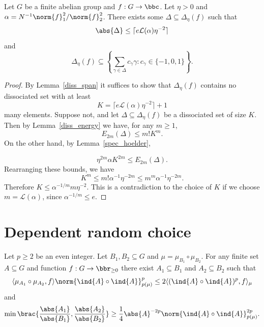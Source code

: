 \begin{theorem}
\label{chang}
\leanok
Let $G$ be a finite abelian group and $f:G\to \bbc$. Let $\eta >0$ and $\alpha=N^{-1}\norm{f}_1^2/\norm{f}_2^2$. There exists some $\Delta\subseteq \Delta_\eta(f)$ such that
\[\abs{\Delta}\le \lceil e\mathcal{L}(\alpha)\eta^{-2}\rceil \]
and
\[\Delta_\eta(f)\subseteq \left\{ \sum_{\gamma\in\Delta}c_\gamma \gamma : c_\gamma\in \{-1,0,1\} \right\}.\]
\end{theorem}

\begin{proof}
\leanok
By Lemma~\ref{diss_span} it suffices to show that $\Delta_\eta(f)$ contains no dissociated set with at least
\[K= \lceil e\mathcal{L}(\alpha)\eta^{-2}\rceil+1\]
many elements. Suppose not, and let $\Delta\subseteq \Delta_\eta(f)$ be a dissociated set of size $K$. Then by Lemma~\ref{diss_energy} we have, for any $m\geq 1$,
\[E_{2m}(\Delta)\le m!K^m.\]
On the other hand, by Lemma~\ref{spec_hoelder},

\[\eta^{2m}\alpha K^{2m}\le E_{2m}(\Delta).\]
Rearranging these bounds, we have
\[K^m \le m! \alpha^{-1}\eta^{-2m}\le m^m\alpha^{-1}\eta^{-2m}.\]
Therefore $K\le \alpha^{-1/m}m\eta^{-2}$. This is a contradiction to the choice of $K$ if we choose $m=\mathcal{L}(\alpha)$, since $\alpha^{-1/m}\le e$.
\end{proof}


\chapter{Dependent random choice}


\begin{lemma}
\label{drc}
\leanok
Let $p\geq 2$ be an even integer. Let $B_1,B_2\subseteq G$ and $\mu=\mu_{B_1}\circ\mu_{B_2}$. For any finite set $A\subseteq G$ and function $f:G\to\bbr_{\geq 0}$ there exist $A_1\subseteq B_1$ and $A_2\subseteq B_2$ such that
\[\langle \mu_{A_1}\circ \mu_{A_2}, f\rangle \norm{\ind{A}\circ \ind{A}}_{p(\mu)}^p\leq 2\langle (\ind{A}\circ \ind{A})^p,f\rangle_\mu\]
and
\[\min\brac{\frac{\abs{A_1}}{\abs{B_1}},\frac{\abs{A_2}}{\abs{B_2}}}\geq \frac{1}{4}\abs{A}^{-2p}\norm{\ind{A}\circ \ind{A}}_{p(\mu)}^{2p}.\]
\end{lemma}

